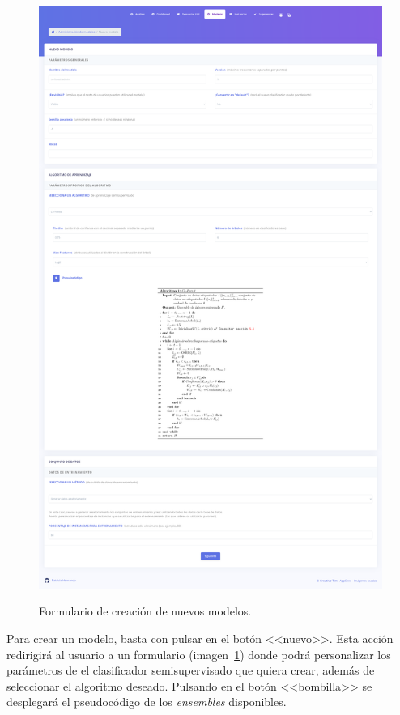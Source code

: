 \begin{figure}[h]
	\caption[Manual de usuario: nuevo modelo]{Formulario de creación de nuevos modelos.}
	\centering
	\includegraphics[scale=0.14]{../img/anexos/user_guide/5_new_model}
	\label{e-5:new-model}
\end{figure}

Para crear un modelo, basta con pulsar en el botón <<nuevo>>. Esta acción redirigirá al usuario a un formulario (imagen~\ref{e-5:new-model}) donde podrá personalizar los parámetros de el clasificador semisupervisado que quiera crear, además de seleccionar el algoritmo deseado. Pulsando en el botón <<bombilla>> se desplegará el pseudocódigo de los \textit{ensembles} disponibles.

